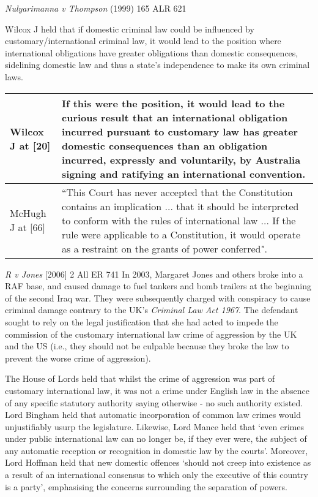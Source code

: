 \begin{casedetails}{\textit{Nulyarimanna v Thompson} (1999) 165 ALR 621}
    \vspace{\baselineskip}

    Wilcox J held that if domestic criminal law could be influenced by customary/international criminal law, it would lead to the position where international obligations have greater obligations than domestic consequences, sidelining domestic law and thus a state's independence to make its own criminal laws.

    \begin{longtable}{p{}|>{\raggedright\arraybackslash}p{}}
        Wilcox J at [20] & If this were the position, it would lead to the curious result that an international obligation incurred pursuant to customary law has greater domestic consequences than an obligation incurred, expressly and voluntarily, by Australia signing and ratifying an international convention. \\[0.5cm]\hline
        McHugh J at [66] & ``This Court has never accepted that the Constitution contains an implication ... that it should be interpreted to conform with the rules of international law ... If the rule were applicable to a Constitution, it would operate as a restraint on the grants of power conferred".
    \end{longtable} 

\end{casedetails}

\begin{casedetails}{\textit{R v Jones} [2006] 2 All ER 741}\label{case: R v Jones}
    \flushleft
    In 2003, Margaret Jones and others broke into a RAF base, and caused damage to fuel tankers and bomb trailers at the beginning of the second Iraq war. They were subsequently charged with conspiracy to cause criminal damage contrary to the UK's \textit{Criminal Law Act 1967}. The defendant sought to rely on the legal justification that she had acted to impede the commission of the customary international law crime of aggression by the UK and the US (i.e., they should not be culpable because they broke the law to prevent the worse crime of aggression).

    \vspace{\baselineskip}

    The House of Lords held that whilst the crime of aggression was part of customary international law, it was not a crime under English law in the absence of any specific statutory authority saying otherwise - no such authority existed. Lord Bingham held that automatic incorporation of common law crimes would unjustifiably usurp the legislature. Likewise, Lord Mance held that `even crimes under public international law can no longer be, if they ever were, the subject of any automatic reception or recognition in domestic law by the courts'. Moreover, Lord Hoffman held that new domestic offences `should not creep into existence as a result of an international consensus to which only the executive of this country is a party', emphasising the concerns surrounding the separation of powers.
\end{casedetails}

